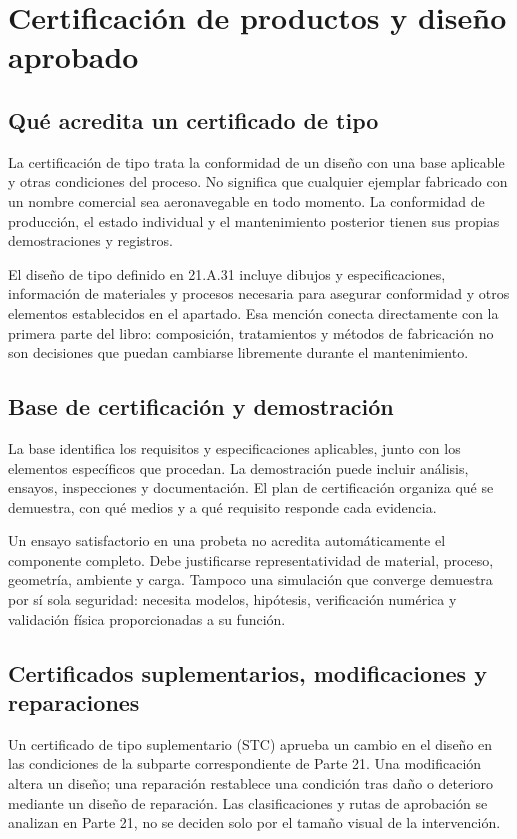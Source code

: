 \chapter{Certificación de productos y diseño aprobado}\label{ch:15}
\section{Qué acredita un certificado de tipo}
La certificación de tipo trata la conformidad de un diseño con una base aplicable y otras condiciones del proceso. No significa que cualquier ejemplar fabricado con un nombre comercial sea aeronavegable en todo momento. La conformidad de producción, el estado individual y el mantenimiento posterior tienen sus propias demostraciones y registros.

El diseño de tipo definido en 21.A.31 incluye dibujos y especificaciones, información de materiales y procesos necesaria para asegurar conformidad y otros elementos establecidos en el apartado. Esa mención conecta directamente con la primera parte del libro: composición, tratamientos y métodos de fabricación no son decisiones que puedan cambiarse libremente durante el mantenimiento.
\section{Base de certificación y demostración}
La base identifica los requisitos y especificaciones aplicables, junto con los elementos específicos que procedan. La demostración puede incluir análisis, ensayos, inspecciones y documentación. El plan de certificación organiza qué se demuestra, con qué medios y a qué requisito responde cada evidencia.

Un ensayo satisfactorio en una probeta no acredita automáticamente el componente completo. Debe justificarse representatividad de material, proceso, geometría, ambiente y carga. Tampoco una simulación que converge demuestra por sí sola seguridad: necesita modelos, hipótesis, verificación numérica y validación física proporcionadas a su función.
\section{Certificados suplementarios, modificaciones y reparaciones}
Un certificado de tipo suplementario (STC) aprueba un cambio en el diseño en las condiciones de la subparte correspondiente de Parte 21. Una modificación altera un diseño; una reparación restablece una condición tras daño o deterioro mediante un diseño de reparación. Las clasificaciones y rutas de aprobación se analizan en Parte 21, no se deciden solo por el tamaño visual de la intervención.

